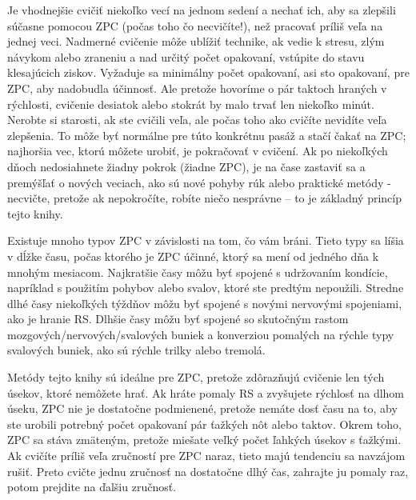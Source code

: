 \documentclass[11pt,a4paper]{book}
\begin{document}
Je vhodnejšie cvičiť niekoľko vecí na jednom sedení a nechať ich, aby sa zlepšili súčasne pomocou ZPC (počas toho čo necvičíte!), než pracovať príliš veľa na jednej veci. Nadmerné cvičenie môže ublížiť technike, ak vedie k stresu, zlým návykom alebo zraneniu a nad určitý počet opakovaní, vstúpite do stavu klesajúcich ziskov. Vyžaduje sa minimálny počet opakovaní, asi sto opakovaní, pre ZPC, aby nadobudla účinnosť. Ale pretože hovoríme o pár taktoch hraných v rýchlosti, cvičenie desiatok alebo stokrát by malo trvať len niekoľko minút. Nerobte si starosti, ak ste cvičili veľa, ale počas toho ako cvičíte nevidíte veľa zlepšenia. To môže byť normálne pre túto konkrétnu pasáž a stačí čakať na ZPC; najhoršia vec, ktorú môžete urobiť, je pokračovať v cvičení. Ak po niekoľkých dňoch nedosiahnete žiadny pokrok (žiadne ZPC), je na čase zastaviť sa a premýšľať o nových veciach, ako sú nové pohyby rúk alebo praktické metódy - necvičte, pretože ak nepokročíte, robíte niečo nesprávne – to je základný princíp tejto knihy.

Existuje mnoho typov ZPC v závislosti na tom, čo vám bráni. Tieto typy sa líšia v dĺžke času, počas ktorého je ZPC účinné, ktorý sa mení od jedného dňa k mnohým mesiacom. Najkratšie časy môžu byť spojené s udržovaním kondície, napríklad s použitím pohybov alebo svalov, ktoré ste predtým nepoužili. Stredne dlhé časy niekoľkých týždňov môžu byť spojené s novými nervovými spojeniami, ako je hranie RS. Dlhšie časy môžu byť spojené so skutočným rastom mozgových/nervových/svalových buniek a konverziou pomalých na rýchle typy svalových buniek, ako sú rýchle trilky alebo tremolá.

Metódy tejto knihy sú ideálne pre ZPC, pretože zdôrazňujú cvičenie len tých úsekov, ktoré nemôžete hrať. Ak hráte pomaly RS a zvyšujete rýchlosť na dlhom úseku, ZPC nie je dostatočne podmienené, pretože nemáte dosť času na to, aby ste urobili potrebný počet opakovaní pár ťažkých nôt alebo taktov. Okrem toho, ZPC sa stáva zmäteným, pretože miešate veľký počet ľahkých úsekov s ťažkými. Ak cvičíte príliš veľa zručností pre ZPC naraz, tieto majú tendenciu sa navzájom rušiť. Preto cvičte jednu zručnosť na dostatočne dlhý čas, zahrajte ju pomaly raz, potom prejdite na ďalšiu zručnosť.
\end{document}
